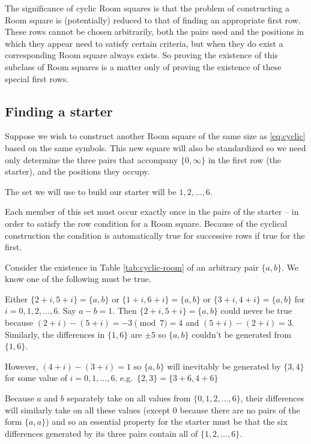 \documentclass[
  11pt,
  a4paper]{book}
\begin{document}
The significance of cyclic Room squares is that the problem
of constructing a Room square is (potentially) reduced to
that of finding an appropriate first row. These rows cannot
be chosen arbitrarily, both the pairs used and the positions
in which they appear need to satisfy certain criteria, but
when they do exist a corresponding Room square always
exists. So proving the existence of this subclass of Room
squares is a matter only of proving the existence of these
special first rows.

\hypertarget{finding-a-starter}{%
\subsection{Finding a starter}\label{finding-a-starter}}

Suppose we wish to construct another Room square of the same
size as \eqref{eq:cyclic} based on the same
symbols. This new square will also be standardized so we
need only determine the three pairs that accompany
\(\{0, \infty\}\) in the first row (the starter), and the
positions they occupy.

The set we will use to build our starter will be
\({1, 2, \ldots, 6}\).

Each member of this set must occur exactly once in the pairs
of the starter -- in order to satisfy the row condition for a
Room square. Because of the cyclical construction the
condition is automatically true for successive rows if true
for the first.

Consider the existence in Table \ref{tab:cyclic-room} of an
arbitrary pair \(\{a, b\}\). We know one of the following must be
true.

Either \(\{2 + i, 5 + i\} = \{a, b\}\) or \(\{1 + i, 6 + i\} = \{a, b\}\)
or \(\{3 + i, 4 + i\} = \{a, b\}\) for \(i = 0, 1, 2, \ldots, 6\).
Say \(a - b = 1\). Then \(\{2 + i, 5 + i\} = \{a, b\}\) could never be
true because \((2 + i) - (5 + i) = -3\pmod 7 = 4\) and
\((5 + i) - (2 + i) = 3\). Similarly, the differences in \(\{1, 6\}\)
are \(\pm 5\) so \(\{a, b\}\) couldn't be generated from \(\{1, 6\}\).

However, \((4 + i) - (3 + i) = 1\) so \(\{a, b\}\) will inevitably be
generated by \(\{3, 4\}\) for some value of \(i = 0, 1, \ldots, 6\).
e.g.~\(\{2, 3\} = \{3 + 6, 4 + 6\}\)

Because \(a\) and \(b\) separately take on all values from
\(\{0, 1, 2, \ldots, 6\}\), their differences will similarly take on
all these values (except 0 because there are no pairs of the form
\(\{a, a\}\)) and so an essential property for the starter must be
that the six differences generated by its three pairs contain all of
\(\{1, 2, \ldots, 6\}\).
\end{document}
